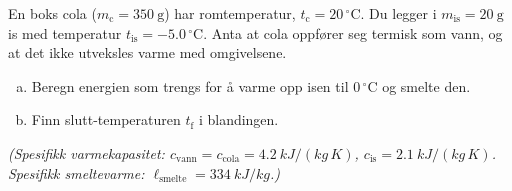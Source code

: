 %
En boks cola ($m_\text{c} = \SI{350}{\gram}$) har romtemperatur, $t_\text{c} = 20\,^\circ$C. Du legger i $m_\text{is} = \SI{20}{\gram}$ is med temperatur $t_\text{is} = -5.0\,^\circ$C. Anta at cola oppfører seg termisk som vann, og at det ikke utveksles varme med omgivelsene.
\begin{enumerate}[a)]
    \item Beregn energien som trengs for å varme opp isen til $0\,^\circ$C og smelte den.
    \item Finn slutt-temperaturen $t_\text{f}$ i blandingen.
\end{enumerate}
\textit{(Spesifikk varmekapasitet: $c_\text{vann} = c_\text{cola} = \SI{4.2}{kJ/(kg\,K)}$, $c_\text{is} = \SI{2.1}{kJ/(kg\,K)}$. Spesifikk smeltevarme: $\ell_\text{smelte} = \SI{334}{kJ/kg}$.)}
%
